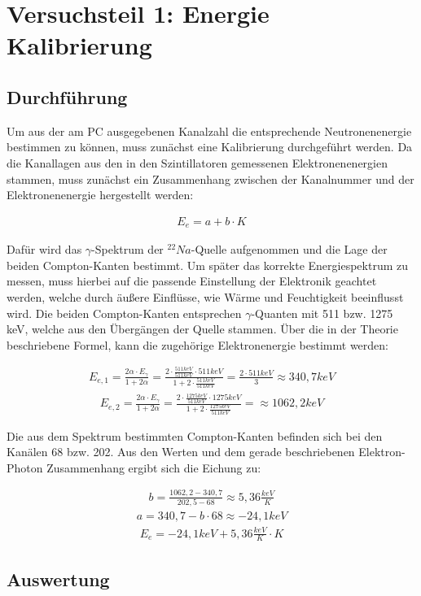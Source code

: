 \section{Versuchsteil 1: Energie Kalibrierung}


\subsection{Durchführung}

Um aus der am PC ausgegebenen Kanalzahl die entsprechende Neutronenenergie bestimmen zu können, muss zunächst eine Kalibrierung durchgeführt werden. Da die Kanallagen aus den in den Szintillatoren gemessenen Elektronenenergien stammen, muss zunächst ein Zusammenhang zwischen der Kanalnummer und der Elektronenenergie hergestellt werden:

\begin{align}
E_e=a+b\cdot K
\end{align}

Dafür wird das $\gamma$-Spektrum der $^{22}Na$-Quelle aufgenommen und die Lage der beiden Compton-Kanten bestimmt. Um später das korrekte Energiespektrum zu messen, muss hierbei auf die passende Einstellung der Elektronik geachtet werden, welche durch äußere Einflüsse, wie Wärme und Feuchtigkeit beeinflusst wird. Die beiden Compton-Kanten entsprechen $\gamma$-Quanten mit 511 bzw. 1275 keV, welche aus den Übergängen der Quelle stammen. Über die in der Theorie beschriebene Formel, kann die zugehörige Elektronenergie bestimmt werden:

\begin{align}
E_{e,1}=\frac{2\alpha \cdot E_{\gamma}}{1 + 2\alpha} = \frac{2\cdot \frac{511keV}{511keV}\cdot 511keV}{1+2\cdot \frac{511keV}{511keV}}=\frac{2\cdot 511keV}{3}\approx 340,7keV
\end{align}
\begin{align}
E_{e,2}=\frac{2\alpha \cdot E_{\gamma}}{1 + 2\alpha} = \frac{2\cdot \frac{1275keV}{511keV}\cdot 1275keV}{1+2\cdot \frac{1275keV}{511keV}}=\approx 1062,2keV
\end{align}

Die aus dem Spektrum bestimmten Compton-Kanten befinden sich bei den Kanälen 68 bzw. 202. Aus den Werten und dem gerade beschriebenen Elektron-Photon Zusammenhang ergibt sich die Eichung zu:

\begin{align}
b= \frac{1062,2-340,7}{202,5-68} \approx 5,36 \frac{keV}{K}
\end{align}
\begin{align}
a=340,7-b\cdot 68 \approx -24,1 keV
\end{align}
\begin{align}
E_e=-24,1 keV +5,36 \frac{keV}{K} \cdot K
\end{align}

\subsection{Auswertung}

